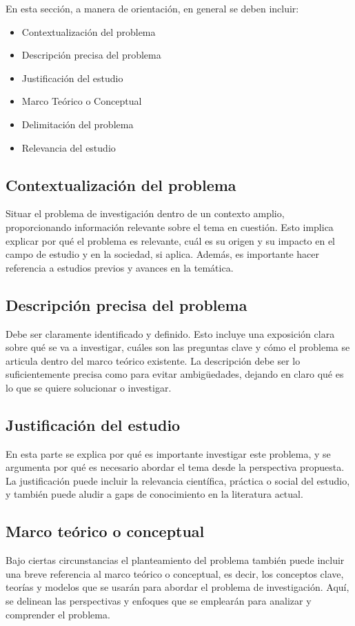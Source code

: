 En esta sección, a manera de orientación, en general se deben incluir:
\begin{itemize}
\item Contextualización del problema 
\item Descripción precisa del problema
\item Justificación del estudio
\item Marco Teórico o Conceptual
\item Delimitación del problema
\item Relevancia del estudio
\end{itemize}



\subsection{Contextualización del problema}
Situar el problema de investigación dentro de un contexto amplio,
proporcionando información relevante sobre el tema en cuestión. Esto
implica explicar por qué el problema es relevante, cuál es su origen y
su impacto en el campo de estudio y en la sociedad, si aplica. Además,
es importante hacer referencia a estudios previos y avances en la
temática.


\subsection{Descripción precisa del problema}
Debe ser claramente identificado y definido. Esto incluye una exposición clara sobre qué se va a investigar, cuáles son las preguntas clave y cómo el problema se articula dentro del marco teórico existente. La descripción debe ser lo suficientemente precisa como para evitar ambigüedades, dejando en claro qué es lo que se quiere solucionar o investigar.

\subsection{Justificación del estudio}
En esta parte se explica por qué es importante investigar este problema, y se argumenta por qué es necesario abordar el tema desde la perspectiva propuesta. La justificación puede incluir la relevancia científica, práctica o social del estudio, y también puede aludir a gaps de conocimiento en la literatura actual.

\subsection{ Marco teórico o conceptual }
Bajo ciertas circunstancias el planteamiento del problema también
puede incluir una breve referencia al marco teórico o conceptual, es
decir, los conceptos clave, teorías y modelos que se usarán para
abordar el problema de investigación. Aquí, se delinean las
perspectivas y enfoques que se emplearán para analizar y comprender el
problema.

